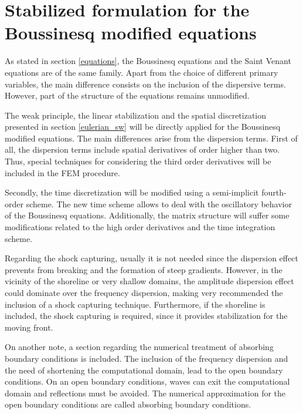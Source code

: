 \section{Stabilized formulation for the Boussinesq modified equations}



As stated in section \ref{equations}, the Boussinesq equations and the Saint Venant equations are of the same family. Apart from the choice of different primary variables, the main difference consists on the inclusion of the dispersive terms. However, part of the structure of the equations remains unmodified.

The weak principle, the linear stabilization and the spatial discretization presented in section \ref{eulerian_sw} will be directly applied for the Boussinesq modified equations. The main differences arise from the dispersion terms.
First of all, the dispersion terms include spatial derivatives of order higher than two. Thus, special techniques for considering the third order derivatives will be included in the FEM procedure.

Secondly, the time discretization will be modified using a semi-implicit fourth-order scheme. The new time scheme allows to deal with the oscillatory behavior of the Boussinesq equations.
Additionally, the matrix structure will suffer some modifications related to the high order derivatives and the time integration scheme.

Regarding the shock capturing, usually it is not needed since the dispersion effect prevents from breaking and the formation of steep gradients. However, in the vicinity of the shoreline or very shallow domains, the amplitude dispersion effect could dominate over the frequency dispersion, making very recommended the inclusion of a shock capturing technique. Furthermore, if the shoreline is included, the shock capturing is required, since it provides stabilization for the moving front.

On another note, a section regarding the numerical treatment of absorbing boundary conditions is included. The inclusion of the frequency dispersion and the need of shortening the computational domain, lead to the open boundary conditions. On an open boundary conditions, waves can exit the computational domain and reflections must be avoided. The numerical approximation for the open boundary conditions are called absorbing boundary conditions.




